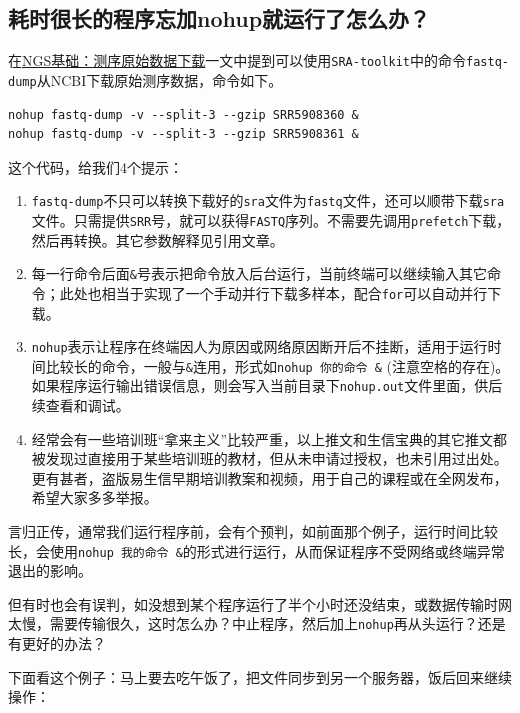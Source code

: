 \documentclass[]{article}
\providecommand{\tightlist}{%
  \setlength{\itemsep}{0pt}\setlength{\parskip}{0pt}}
\numberwithin{figure}{section}
\numberwithin{table}{section}
\begin{document}
\hypertarget{nohup}{%
\subsection{耗时很长的程序忘加nohup就运行了怎么办？}\label{nohup}}

在\href{https://mp.weixin.qq.com/s/6oJYGxuBE850PyjMhRi3xg}{NGS基础：测序原始数据下载}一文中提到可以使用\texttt{SRA-toolkit}中的命令\texttt{fastq-dump}从NCBI下载原始测序数据，命令如下。

\begin{verbatim}
nohup fastq-dump -v --split-3 --gzip SRR5908360 &
nohup fastq-dump -v --split-3 --gzip SRR5908361 &
\end{verbatim}

这个代码，给我们4个提示：

\begin{enumerate}
\def\labelenumi{\arabic{enumi}.}
\tightlist
\item
  \texttt{fastq-dump}不只可以转换下载好的\texttt{sra}文件为\texttt{fastq}文件，还可以顺带下载\texttt{sra}文件。只需提供\texttt{SRR}号，就可以获得\texttt{FASTQ}序列。不需要先调用\texttt{prefetch}下载，然后再转换。其它参数解释见引用文章。
\item
  每一行命令后面\texttt{\&}号表示把命令放入后台运行，当前终端可以继续输入其它命令；此处也相当于实现了一个手动并行下载多样本，配合\texttt{for}可以自动并行下载。
\item
  \texttt{nohup}表示让程序在终端因人为原因或网络原因断开后不挂断，适用于运行时间比较长的命令，一般与\texttt{\&}连用，形式如\texttt{nohup\ 你的命令\ \&} (注意空格的存在)。如果程序运行输出错误信息，则会写入当前目录下\texttt{nohup.out}文件里面，供后续查看和调试。
\item
  经常会有一些培训班``拿来主义''比较严重，以上推文和生信宝典的其它推文都被发现过直接用于某些培训班的教材，但从未申请过授权，也未引用过出处。更有甚者，盗版易生信早期培训教案和视频，用于自己的课程或在全网发布，希望大家多多举报。
\end{enumerate}

言归正传，通常我们运行程序前，会有个预判，如前面那个例子，运行时间比较长，会使用\texttt{nohup\ 我的命令\ \&}的形式进行运行，从而保证程序不受网络或终端异常退出的影响。

但有时也会有误判，如没想到某个程序运行了半个小时还没结束，或数据传输时网太慢，需要传输很久，这时怎么办？中止程序，然后加上\texttt{nohup}再从头运行？还是有更好的办法？

下面看这个例子：马上要去吃午饭了，把文件同步到另一个服务器，饭后回来继续操作：
\end{document}
